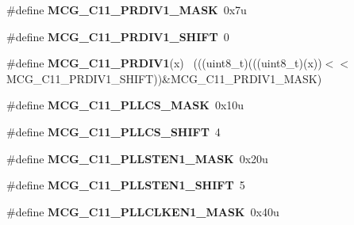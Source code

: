 \begin{DoxyCompactItemize}
\item 
\hypertarget{group___m_c_g___register___masks_ga294bcd1a68b0eb45287f64bb505423f3}{}\#define {\bfseries M\+C\+G\+\_\+\+C11\+\_\+\+P\+R\+D\+I\+V1\+\_\+\+M\+A\+S\+K}~0x7u\label{group___m_c_g___register___masks_ga294bcd1a68b0eb45287f64bb505423f3}

\item 
\hypertarget{group___m_c_g___register___masks_gabe9823ebc0556fd94958a68e9b2f30c9}{}\#define {\bfseries M\+C\+G\+\_\+\+C11\+\_\+\+P\+R\+D\+I\+V1\+\_\+\+S\+H\+I\+F\+T}~0\label{group___m_c_g___register___masks_gabe9823ebc0556fd94958a68e9b2f30c9}

\item 
\hypertarget{group___m_c_g___register___masks_ga7040b100df552539c090b2fd1f7d8e9b}{}\#define {\bfseries M\+C\+G\+\_\+\+C11\+\_\+\+P\+R\+D\+I\+V1}(x)                                            ~(((uint8\+\_\+t)(((uint8\+\_\+t)(x))$<$$<$M\+C\+G\+\_\+\+C11\+\_\+\+P\+R\+D\+I\+V1\+\_\+\+S\+H\+I\+F\+T))\&M\+C\+G\+\_\+\+C11\+\_\+\+P\+R\+D\+I\+V1\+\_\+\+M\+A\+S\+K)\label{group___m_c_g___register___masks_ga7040b100df552539c090b2fd1f7d8e9b}

\item 
\hypertarget{group___m_c_g___register___masks_ga62e2d73fdc3f27abf6e8f9661389f59c}{}\#define {\bfseries M\+C\+G\+\_\+\+C11\+\_\+\+P\+L\+L\+C\+S\+\_\+\+M\+A\+S\+K}~0x10u\label{group___m_c_g___register___masks_ga62e2d73fdc3f27abf6e8f9661389f59c}

\item 
\hypertarget{group___m_c_g___register___masks_gab1e4fe676b696e6f011a899038c5b2fb}{}\#define {\bfseries M\+C\+G\+\_\+\+C11\+\_\+\+P\+L\+L\+C\+S\+\_\+\+S\+H\+I\+F\+T}~4\label{group___m_c_g___register___masks_gab1e4fe676b696e6f011a899038c5b2fb}

\item 
\hypertarget{group___m_c_g___register___masks_gaa0c3db9f98e9a0e72efd4a2a957e4f58}{}\#define {\bfseries M\+C\+G\+\_\+\+C11\+\_\+\+P\+L\+L\+S\+T\+E\+N1\+\_\+\+M\+A\+S\+K}~0x20u\label{group___m_c_g___register___masks_gaa0c3db9f98e9a0e72efd4a2a957e4f58}

\item 
\hypertarget{group___m_c_g___register___masks_ga237b81ec65f848164653d8022de04d79}{}\#define {\bfseries M\+C\+G\+\_\+\+C11\+\_\+\+P\+L\+L\+S\+T\+E\+N1\+\_\+\+S\+H\+I\+F\+T}~5\label{group___m_c_g___register___masks_ga237b81ec65f848164653d8022de04d79}

\item 
\hypertarget{group___m_c_g___register___masks_gaceff9dfbf9cb5aebfd0443afff6c5ccf}{}\#define {\bfseries M\+C\+G\+\_\+\+C11\+\_\+\+P\+L\+L\+C\+L\+K\+E\+N1\+\_\+\+M\+A\+S\+K}~0x40u\label{group___m_c_g___register___masks_gaceff9dfbf9cb5aebfd0443afff6c5ccf}


\end{DoxyCompactItemize}
